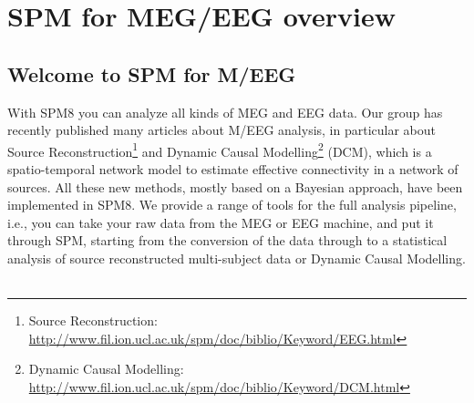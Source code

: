 \chapter{SPM for MEG/EEG overview \label{Chap:eeg:overview}}

\section{Welcome to SPM for M/EEG}

With SPM8 you can analyze all kinds of MEG and EEG data. Our group has recently published many articles about M/EEG analysis, in particular about Source Reconstruction\footnote{Source Reconstruction: \url{http://www.fil.ion.ucl.ac.uk/spm/doc/biblio/Keyword/EEG.html}} and Dynamic Causal Modelling\footnote{Dynamic Causal Modelling: \url{http://www.fil.ion.ucl.ac.uk/spm/doc/biblio/Keyword/DCM.html}} (DCM), which is a spatio-temporal network model to estimate effective connectivity in a network of sources. All these new methods, mostly based on a Bayesian approach, have been implemented in SPM8. We provide a range of tools for the full analysis pipeline, i.e., you can take your raw data from the MEG or EEG machine, and put it through SPM, starting from the conversion of the data through to a statistical analysis of source reconstructed multi-subject data or Dynamic Causal Modelling.
\\
\\
